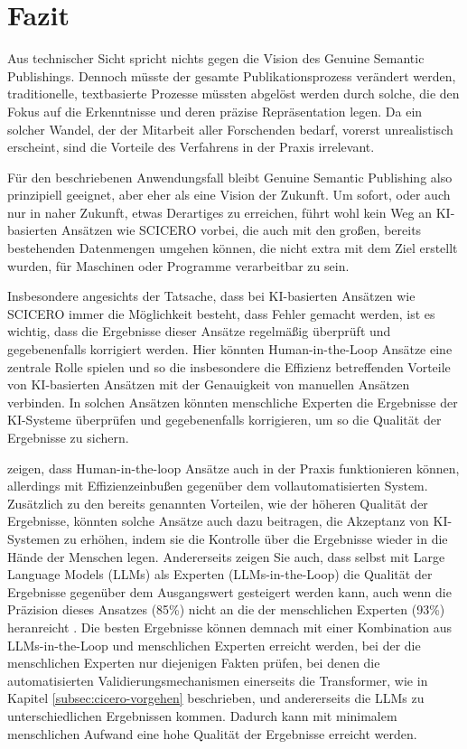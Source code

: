 \section{Fazit}
\label{sec:fazit}

Aus technischer Sicht spricht nichts gegen die Vision des Genuine Semantic Publishings.
Dennoch müsste der gesamte Publikationsprozess verändert werden, traditionelle, textbasierte Prozesse müssten abgelöst werden durch solche, die den Fokus auf die Erkenntnisse und deren präzise Repräsentation legen.
Da ein solcher Wandel, der der Mitarbeit aller Forschenden bedarf, vorerst unrealistisch erscheint, sind die Vorteile des Verfahrens in der Praxis irrelevant.

Für den beschriebenen Anwendungsfall bleibt Genuine Semantic Publishing also prinzipiell geeignet, aber eher als eine Vision der Zukunft.
Um sofort, oder auch nur in naher Zukunft, etwas Derartiges zu erreichen, führt wohl kein Weg an KI-basierten Ansätzen wie SCICERO vorbei, die auch mit den großen, bereits bestehenden Datenmengen umgehen können, die nicht extra mit dem Ziel erstellt wurden, für Maschinen oder Programme verarbeitbar zu sein.

Insbesondere angesichts der Tatsache, dass bei KI-basierten Ansätzen wie SCICERO immer die Möglichkeit besteht, dass Fehler gemacht werden, ist es wichtig, dass die Ergebnisse dieser Ansätze regelmäßig überprüft und gegebenenfalls korrigiert werden.
Hier könnten Human-in-the-Loop Ansätze eine zentrale Rolle spielen und so die \textemdash insbesondere die Effizienz betreffenden \textemdash Vorteile von KI-basierten Ansätzen mit der Genauigkeit von manuellen Ansätzen verbinden.
In solchen Ansätzen könnten menschliche Experten die Ergebnisse der KI-Systeme überprüfen und gegebenenfalls korrigieren, um so die Qualität der Ergebnisse zu sichern.

\citet{Tsaneva2024EnhancingSK} zeigen, dass Human-in-the-loop Ansätze auch in der Praxis funktionieren können, allerdings mit Effizienzeinbußen gegenüber dem vollautomatisierten System.
Zusätzlich zu den bereits genannten Vorteilen, wie der höheren Qualität der Ergebnisse, könnten solche Ansätze auch dazu beitragen, die Akzeptanz von KI-Systemen zu erhöhen, indem sie die Kontrolle über die Ergebnisse wieder in die Hände der Menschen legen.
Andererseits zeigen Sie auch, dass selbst mit Large Language Models (LLMs) als Experten (LLMs-in-the-Loop) die Qualität der Ergebnisse gegenüber dem Ausgangswert gesteigert werden kann, auch wenn die Präzision dieses Ansatzes (85\%) nicht an die der menschlichen Experten (93\%) heranreicht \cite{Tsaneva2024EnhancingSK}.
Die besten Ergebnisse können demnach mit einer Kombination aus LLMs-in-the-Loop und menschlichen Experten erreicht werden, bei der die menschlichen Experten nur diejenigen Fakten prüfen, bei denen die automatisierten Validierungsmechanismen \textemdash einerseits die Transformer, wie in Kapitel \ref{subsec:cicero-vorgehen} beschrieben, und andererseits die LLMs \textemdash zu unterschiedlichen Ergebnissen kommen.
Dadurch kann mit minimalem menschlichen Aufwand eine hohe Qualität der Ergebnisse erreicht werden.